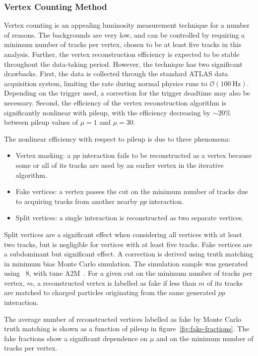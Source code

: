 \subsubsection{Vertex Counting Method}
Vertex counting is an appealing luminosity measurement technique for a number of reasons. The backgrounds are very low, and can be controlled by requiring a minimum number of tracks per vertex, chosen to be at least five tracks in this analysis. Further, the vertex reconstruction efficiency is expected to be stable throughout the data-taking period. However, the technique has two significant drawbacks. First, the data is collected through the standard ATLAS data acquisition system, limiting the rate during normal physics runs to $\mathcal{O}(100~\mbox{Hz})$. Depending on the trigger used, a correction for the trigger deadtime may also be necessary. Second, the efficiency of the vertex reconstruction algorithm is significantly nonlinear with pileup, with the efficiency decreasing by $\sim20\%$ between pileup values of $\mu=1$ and $\mu=30$. 

The nonlinear efficiency with respect to pileup is due to three phenomena:

\begin{itemize}
	\item Vertex masking: a $pp$ interaction fails to be reconstructed as a vertex because some or all of its tracks are used by an earlier vertex in the iterative algorithm. 
	\item Fake vertices: a vertex passes the cut on the minimum number of tracks due to acquiring tracks from another nearby $pp$ interaction.
	\item Split vertices: a single interaction is reconstructed as two separate vertices.
\end{itemize}

Split vertices are a significant effect when considering all vertices with at least two tracks, but is negligible for vertices with at least five tracks. Fake vertices are a subdominant but significant effect. A correction is derived using truth matching in minimum bias Monte Carlo simulation. The simulation sample was generated using \pythia~8, with tune A2M~\cite{pythia}. For a given cut on the minimum number of tracks per vertex, $m$, a reconstructed vertex is labelled as fake if less than $m$ of its tracks are matched to charged particles originating from the same generated $pp$ interaction.

The average number of reconstructed vertices labelled as fake by Monte Carlo truth matching is shown as a function of pileup in figure~\ref{fig:fake-fractions}. The fake fractions show a significant dependence on $\mu$ and on the minimum number of tracks per vertex.

